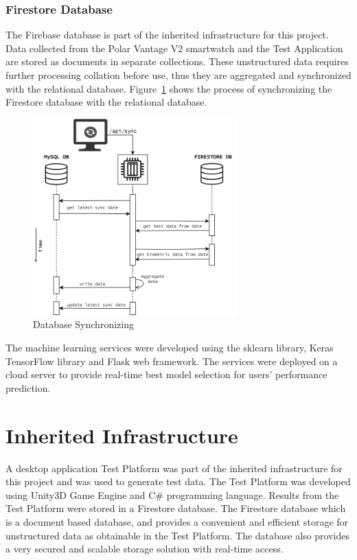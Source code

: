 \subsubsection{Firestore Database}
The Firebase database is part of the inherited infrastructure for this project. Data collected from the Polar Vantage V2 smartwatch and the Test 
Application are stored as documents in separate collections. These unstructured data requires further processing collation before use, thus they 
are aggregated and synchronized with the relational database. Figure~\ref{image:db_sync} shows the process of synchronizing the Firestore database
with the relational database.
\begin{figure}[h!]
    \centering
    \includegraphics[width=0.7\textwidth]{images/db_sync.png}
    \caption{Database Synchronizing}
    \label{image:db_sync}
\end{figure}



The machine learning services were developed using the 
sklearn library, Keras TensorFlow library and Flask web framework. The services were deployed on a cloud server to provide real-time best
model selection for users' performance prediction.

\section{Inherited Infrastructure}

A desktop application Test Platform was part of the inherited infrastructure for this project and was used to generate test data.
The Test Platform was developed using Unity3D Game Engine and C\# programming language. Results from the Test Platform were stored in 
a Firestore database. The Firestore database which is a document based database, and provides a convenient and efficient storage for 
unstructured data as obtainable in the Test Platform. The database also provides a very secured and scalable storage solution with 
real-time access.

